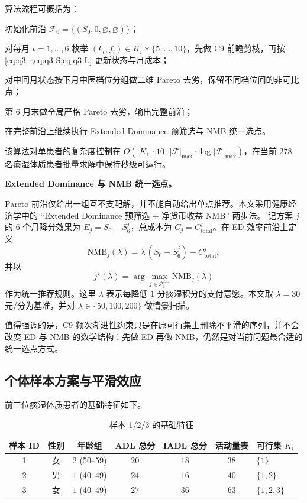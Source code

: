 \documentclass{MathorCupmodeling}
\providecommand{\tightlist}{%
  \setlength{\itemsep}{0pt}\setlength{\parskip}{0pt}}
\begin{document}
算法流程可概括为：
\begin{description}
\tightlist
\item[Step 1] 初始化前沿 $\mathcal{F}_0 = \{(S_0, 0, \varnothing, \varnothing)\}$；
\item[Step 2] 对每月 $t=1,\dots,6$ 枚举 $(k_t,f_t)\in K_i\times\{5,\dots,10\}$，先做 C9 前瞻剪枝，再按 \cref{eq:q3-r,eq:q3-S,eq:q3-L} 更新状态与月成本；
\item[Step 3] 对中间月状态按下月中医档位分组做二维 Pareto 去劣，保留不同档位间的非可比点；
\item[Step 4] 第 $6$ 月末做全局严格 Pareto 去劣，输出完整前沿；
\item[Step 5] 在完整前沿上继续执行 Extended Dominance 预筛选与 NMB 统一选点。
\end{description}
该算法对单患者的复杂度控制在 $O(|K_i|\cdot 10\cdot |\mathcal{F}|_{\max}\cdot\log|\mathcal{F}|_{\max})$，在当前 $278$ 名痰湿体质患者批量求解中保持秒级可运行。

\noindent\textbf{Extended Dominance 与 NMB 统一选点。}

Pareto 前沿仅给出一组互不支配解，并不能自动给出单点推荐。本文采用健康经济学中的 ``Extended Dominance 预筛选 $+$ 净货币收益 NMB'' 两步法。
记方案 $j$ 的 $6$ 个月降分效果为 $E_j = S_0 - S_6^j$，总成本为 $C_j = C_{\text{total}}^j$。在 ED 效率前沿上定义
\begin{equation}\label{eq:q3-nmb}
\mathrm{NMB}_j(\lambda) = \lambda\,(S_0 - S_6^j) - C_{\text{total}}^j,
\end{equation}
并以
\begin{equation}\label{eq:q3-argmax}
j^\star(\lambda) = \arg\max_{j\in \mathcal{P}_i^{\mathrm{ED}}} \mathrm{NMB}_j(\lambda)
\end{equation}
作为统一推荐规则。这里 $\lambda$ 表示每降低 $1$ 分痰湿积分的支付意愿。本文取 $\lambda=30$ 元/分为基准，并对 $\lambda\in\{50,100,200\}$ 做情景扫描。

值得强调的是，C9 频次渐进性约束只是在原可行集上删除不平滑的序列，并不会改变 ED 与 NMB 的数学结构：先做 ED 再做 NMB，仍然是对当前问题最合适的统一选点方式。

\subsection{个体样本方案与平滑效应}

前三位痰湿体质患者的基础特征如下。

\begin{table}[H]
\centering\small
\caption{样本 1/2/3 的基础特征}\label{tab:q3-samples-base}
\begin{tabular}{@{}c c c c c c l@{}}
\toprule
样本 ID & 性别 & 年龄组 & ADL 总分 & IADL 总分 & 活动量表 & 可行集 $K_i$ \\
\midrule
1 & 女 & $2$ (50--59) & $20$ & $18$ & $38$ & $\{1\}$ \\
2 & 男 & $1$ (40--49) & $24$ & $16$ & $40$ & $\{1,2\}$ \\
3 & 女 & $1$ (40--49) & $27$ & $36$ & $63$ & $\{1,2,3\}$ \\
\bottomrule
\end{tabular}
\end{table}
\end{document}

